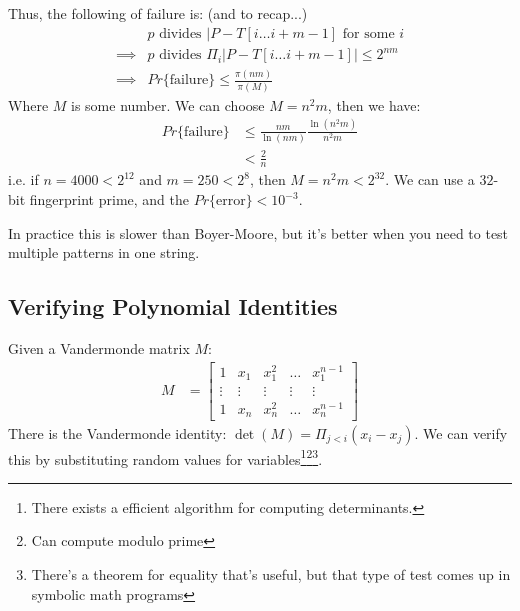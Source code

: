                     Thus, the following of failure is: (and to recap...)
                    \begin{align*}
                        & \text{$p$ divides } |P - T[i \ldots i + m - 1] \text{ for some $i$} \\
                        \implies & \text{$p$ divides } \Pi_i |P - T[i \ldots i + m - 1]| \le 2^{nm} \\
                        \implies & Pr\{ \text{failure} \} \le \frac{\pi(nm)}{\pi(M)}
                    \end{align*}
                    Where $M$ is some number.
                    We can choose $M = n^2 m$, then we have:
                    \begin{align*}
                        Pr\{\text{failure}\} &\le \frac{nm}{\ln (nm)} \frac{\ln(n^2 m)}{n^2 m} \\
                        &< \frac{2}{n}
                    \end{align*}
                    i.e. if $n = 4000 < 2^{12}$ and $m = 250 < 2^8$, then $M = n^2 m < 2^{32}$.
                    We can use a $32$-bit fingerprint prime, and the $Pr\{\text{error}\} < 10^{-3}$.

                    In practice this is slower than Boyer-Moore, but it's better when you need to test multiple patterns in one string.
            \subsection{Verifying Polynomial Identities} %
            \label{sub:verifying_polynomial_identities}
                Given a Vandermonde matrix $M$:
                \begin{align*}
                    M &=
                    \left[
                        \begin{array}{ccccc}
                            1 & x_1 & x_1^2 & \ldots & x_1 ^{n-1} \\
                            \vdots & \vdots & \vdots & \vdots & \vdots \\
                            1 & x_n & x_n^2 & \ldots & x_n ^{n-1}
                        \end{array}
                    \right]
                \end{align*}
                There is the Vandermonde identity: $\det(M) = \Pi_{j < i} (x_i - x_j)$.
                We can {verify} this by substituting random values for variables\footnote{There exists a efficient algorithm for computing determinants.}\footnote{Can compute modulo prime}\footnote{There's a theorem for equality that's useful, but that type of test comes up in symbolic math programs}.
